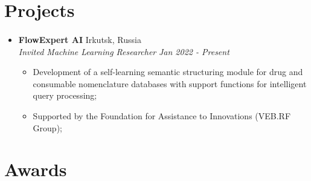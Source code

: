 \documentclass[10pt]{article}
\begin{document}

\section{Projects}
\paragraph{}

\begin{itemize}[noitemsep,topsep=0pt]
    \item \normalsize{\textbf{FlowExpert AI}} \normalsize{\hfill Irkutsk, Russia 
    \\    \textit{ Invited Machine Learning Researcher }
                                                                \hfill \textit{Jan 2022 - Present}}
            \begin{itemize}[itemsep=1pt,topsep=4pt] \normalsize
                \item {Development of a self-learning semantic structuring module for drug and consumable nomenclature databases with support functions for intelligent query processing;}
                \item {Supported by the Foundation for Assistance to Innovations (VEB.RF Group);}
                
            \end{itemize}

        \end{itemize}


\section{Awards}
\paragraph{}
\end{document}
